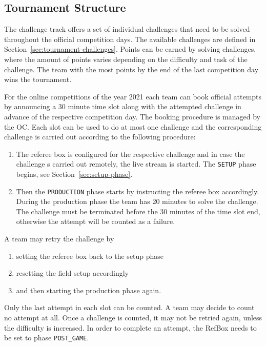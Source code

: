 \documentclass[12pt,twoside]{article}
\newcommand{\refsec}[1]{Section~\ref{#1}}
\begin{document}
\subsection{Tournament Structure}
The challenge track offers a set of individual challenges that need to be solved
throughout the official competition days.
The available challenges are defined in \refsec{sec:tournament-challenges}.
Points can be earned by solving challenges, where the amount of points varies
depending on the difficulty and task of the challenge.
The team with the most points by the end of the last competition day wins
the tournament.

For the online competitions of the year 2021 each team can book official
attempts by announcing a 30 minute time slot along with the attempted challenge
in advance of the respective competition day.
The booking procedure is managed by the \ac{OC}.
Each slot can be used to do at most one challenge and the corresponding
challenge is carried out according to the following procedure:
\begin{enumerate}
  \item The referee box is configured for the respective challenge and in case
    the challenge s carried out remotely, the live stream is started.
    The \texttt{SETUP} phase begins, see \refsec{sec:setup-phase}.
	\item Then the \texttt{PRODUCTION} phase starts by instructing the referee
    box accordingly.
    During the production phase the team has 20 minutes to solve the challenge.
    The challenge must be terminated before the 30 minutes of the time slot end,
    otherwise the attempt will be counted as a failure.
\end{enumerate}


A team may retry the challenge by
\begin{enumerate}
	\item setting the referee box back to the setup phase
	\item resetting the field setup accordingly
	\item and then starting the production phase again.
\end{enumerate}
Only the last attempt in each slot can be counted. A team may decide to count
no attempt at all. Once a challenge is counted, it
may not be retried again, unless the difficulty is increased.
In order to complete an attempt, the RefBox needs to be set to phase
\texttt{POST\_GAME}.
\end{document}
